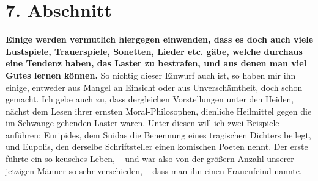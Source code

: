 \section{7. Abschnitt} \label{kap17_ab7}

\label{ref:17_07_einwand}
\textbf{Einige werden vermutlich hiergegen einwenden, dass es doch auch viele
Lustspiele, Trauerspiele, Sonetten, Lieder etc. gäbe, welche durchaus eine
Tendenz haben, das Laster zu bestrafen, und aus denen man viel Gutes lernen
können.} So nichtig dieser Einwurf auch ist, so haben mir ihn einige, entweder
aus
Mangel an Einsicht oder aus Unverschämtheit, doch schon gemacht. Ich gebe
auch zu, dass dergleichen Vorstellungen unter den Heiden, nächst dem Lesen ihrer
ernsten Moral-Philosophen, dienliche Heilmittel gegen die im Schwange gehenden
Laster waren. Unter diesen will ich zwei Beispiele anführen:
Euripides, dem
Suidas die Benennung eines tragischen Dichters beilegt, und
Eupolis, den
derselbe Schriftsteller einen komischen Poeten nennt. Der erste führte ein so
keusches Leben, -- und war also von der größern Anzahl unserer jetzigen Männer
so sehr verschieden, -- dass man ihn einen
Frauenfeind nannte,

\medskip

